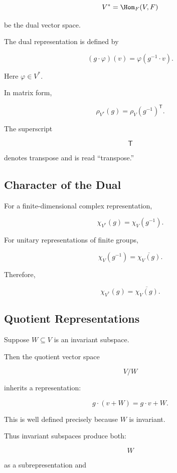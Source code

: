 \[ V^*=\Hom_F(V,F) \]

be the dual vector space.

The dual representation is defined by

\[ (g\cdot\varphi)(v)=\varphi(g^{-1}\cdot v). \]

Here \(\varphi\in V^*\).

In matrix form,

\[ \rho_{V^*}(g)=\rho_V(g^{-1})^{\mathsf T}. \]

The superscript

\[ \mathsf T \]

denotes transpose and is read ``transpose.''

\subsection{Character of the Dual}
\label{subsec:character-dual}

For a finite-dimensional complex representation,

\[ \chi_{V^*}(g)=\chi_V(g^{-1}). \]

For unitary representations of finite groups,

\[ \chi_V(g^{-1})=\overline{\chi_V(g)}. \]

Therefore,

\[ \chi_{V^*}(g)=\overline{\chi_V(g)}. \]

\subsection{Quotient Representations}
\label{subsec:quotient-representations}

Suppose \(W\subseteq V\) is an invariant subspace.

Then the quotient vector space

\[ V/W \]

inherits a representation:

\[ g\cdot(v+W)=g\cdot v+W. \]

This is well defined precisely because \(W\) is invariant.

Thus invariant subspaces produce both:

\[ W \]

as a subrepresentation and

